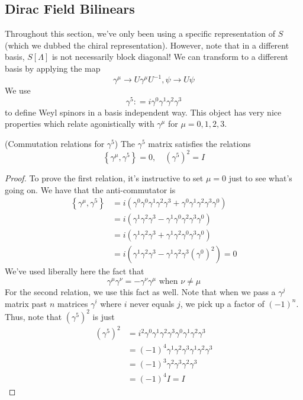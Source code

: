 \subsection{Dirac Field Bilinears}  
Throughout this section, 
we've only been using a specific representation 
of $ S $ (which we dubbed the chiral representation). 
However, note that in a different basis,  $ S [ \Lambda ] $ is not necessarily block diagonal! We can transform to a different 
basis by applying the map  
\[
 \gamma ^ \mu \to U \gamma ^ \mu U ^{ - 1 }, \psi \to U \psi 
\] We use 
\[
 \gamma ^{ 5 }  : = i \gamma ^ 0 \gamma ^ 1 \gamma ^ 2 \gamma ^ 3 
\]  to define Weyl spinors in a basis independent way. 
This object has very nice properties which relate 
agonistically with $ \gamma ^ \mu $ for $ \mu  = 0 , 1, 2,3 $. 
\begin{claim}{(Commutation relations for $ \gamma ^ 5 $)}
	The $ \gamma ^ 5$ matrix satisfies the 
	relations 
\[
	\left\{  \gamma ^ \mu , \gamma ^ 5 \right\}   = 0 , \quad  \left(  \gamma ^ 5  \right)  ^ 2 = I \] 

\begin{proof}
	To prove the first 
relation, it's instructive to set $ \mu  =0  $ just to 
see what's going on. We have that the anti-commutator is 
\begin{align*}
	\left\{ \gamma ^ \mu , \gamma ^ 5  \right\}  &=  i ( 
	\gamma ^ 0 \gamma ^ 0 \gamma ^ 1 \gamma ^ 2 \gamma ^ 3  + 
	\gamma ^ 0 \gamma ^ 1 \gamma ^ 2 \gamma ^ 3 \gamma ^ 0 ) \\
						     &=  i ( \gamma ^ 1 \gamma ^ 2 \gamma ^ 3 - \gamma ^ 1 \gamma ^ 0 \gamma ^ 2 \gamma ^ 3 \gamma ^ 0 )  \\
						     &=  i ( \gamma ^ 1 \gamma ^ 2 \gamma ^ 3 + \gamma ^ 1 \gamma ^ 2 \gamma ^ 0 \gamma ^ 3 \gamma ^ 0 )  \\
						     &=  i ( \gamma ^ 1 \gamma ^ 2 \gamma ^ 3 - \gamma ^ 1 \gamma ^ 2 \gamma ^ 3 ( \gamma ^ 0 ) ^ 2 )   = 0
\end{align*}
We've used liberally here the fact that 
\[
 \gamma ^ \mu \gamma ^ \nu = - \gamma ^ \nu \gamma ^ \mu \text{ when } \nu \neq \mu 
\] For the second relation, we use this fact as well. 
Note that when we pass a $ \gamma ^ j  $ matrix
past $ n $ matrices $ \gamma ^ i $ where $ i $ never equals
$ j  $, we pick up a factor of $ ( - 1) ^ n $. 
Thus, note that $ ( \gamma ^ 5 ) ^ 2$ is just 
\begin{align*}
	( \gamma ^ 5) ^ 2 & = i^ 2 \gamma ^ 0 \gamma ^ 1 \gamma ^ 2 \gamma ^ 3 \gamma ^ 0 \gamma ^ 1 \gamma ^ 2 \gamma ^ 3 \\
			  &=  ( - 1) ^ 4 \gamma ^ 1 \gamma ^ 2 \gamma ^ 3 \gamma ^ 1 \gamma ^ 2 \gamma ^ 3  \\
			  &=  ( - 1) ^ 3 \gamma ^ 2 \gamma ^ 3 \gamma ^ 2 \gamma ^ 3  \\
			  &=  ( - 1) ^ 4 I  = I 
\end{align*} 
\end{proof}
\end{claim}
